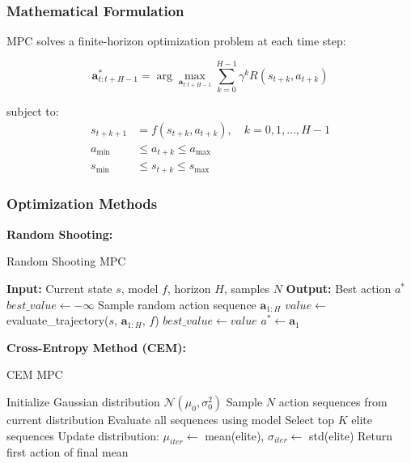 \documentclass[12pt]{article}
\numberwithin{equation}{section}
\numberwithin{figure}{section}
\numberwithin{table}{section}
\numberwithin{algorithm}{section}
\begin{document}
{{{\subsubsection{Mathematical Formulation}
MPC solves a finite-horizon optimization problem at each time step:

\begin{equation}
\mathbf{a}^*_{t:t+H-1} = \arg\max_{\mathbf{a}_{t:t+H-1}} \sum_{k=0}^{H-1} \gamma^k R(s_{t+k}, a_{t+k})
\end{equation}

subject to:
\begin{align}
s_{t+k+1} &= f(s_{t+k}, a_{t+k}), \quad k = 0, 1, \ldots, H-1 \\
a_{\min} &\leq a_{t+k} \leq a_{\max} \\
s_{\min} &\leq s_{t+k} \leq s_{\max}
\end{align}

\subsubsection{Optimization Methods}

\textbf{Random Shooting:}
\begin{algorithm}[H]
\caption{Random Shooting MPC}
\begin{algorithmic}[1]
\STATE \textbf{Input:} Current state $s$, model $f$, horizon $H$, samples $N$
\STATE \textbf{Output:} Best action $a^*$
\STATE $best\_value \leftarrow -\infty$
    \STATE Sample random action sequence $\mathbf{a}_{1:H}$
    \STATE $value \leftarrow$ evaluate\_trajectory($s$, $\mathbf{a}_{1:H}$, $f$)
        \STATE $best\_value \leftarrow value$
        \STATE $a^* \leftarrow \mathbf{a}_1$
    \ENDIF
\ENDFOR
\end{algorithmic}
\end{algorithm}

\textbf{Cross-Entropy Method (CEM):}
\begin{algorithm}[H]
\caption{CEM MPC}
\begin{algorithmic}[1]
\STATE Initialize Gaussian distribution $\mathcal{N}(\mu_0, \sigma_0^2)$
    \STATE Sample $N$ action sequences from current distribution
    \STATE Evaluate all sequences using model
    \STATE Select top $K$ elite sequences
    \STATE Update distribution: $\mu_{iter} \leftarrow$ mean(elite), $\sigma_{iter} \leftarrow$ std(elite)
\ENDFOR
\STATE Return first action of final mean
\end{algorithmic}
\end{algorithm}

}}}
\end{document}
